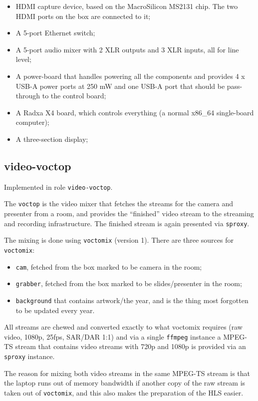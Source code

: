 \documentclass{article}
\begin{document}
\begin{itemize}
  \item HDMI capture device, based on the MacroSilicon MS2131 chip. The two HDMI ports on the box are connected to it;
  \item A 5-port Ethernet switch;
  \item A 5-port audio mixer with 2 XLR outputs and 3 XLR inputs, all for line level;
  \item A power-board that handles powering all the components and provides 4 x USB-A power ports at 250 mW and one USB-A port that should be pass-through to the control board;
  \item A Radxa X4 board, which controls everything (a normal x86_64 single-board computer);
  \item A three-section display;
\end{itemize}

\subsection{video-voctop}

Implemented in role \texttt{video-voctop}.

The \texttt{voctop} is the video mixer that fetches the streams for the camera
and presenter from a room, and provides the ``finished'' video stream to the
streaming and recording infrastructure. The finished stream is again presented
via \texttt{sproxy}.

The mixing is done using \texttt{voctomix} (version 1). There are three sources
for \texttt{voctomix}:

\begin{itemize}
  \item \texttt{cam}, fetched from the box marked to be camera in the room;
  \item \texttt{grabber}, fetched from the box marked to be slides/presenter in the room;
  \item \texttt{background} that contains artwork/the year, and is the thing most forgotten to be updated every year.
\end{itemize}

All streams are chewed and converted exactly to what voctomix requires (raw
video, 1080p, 25fps, SAR/DAR 1:1) and via a single \texttt{ffmpeg} instance a
MPEG-TS stream that contains video streams with 720p and 1080p is provided
via an \texttt{sproxy} instance.

The reason for mixing both video streams in the same MPEG-TS stream is that the
laptop runs out of memory bandwidth if another copy of the raw stream is taken
out of \texttt{voctomix}, and this also makes the preparation of the HLS
easier.
\end{document}
